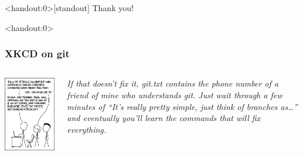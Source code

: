 \documentclass[10pt,svgnames,handout]{beamer}
\begin{document}


\begin{frame}<handout:0>[standout]
Thank you!
\end{frame}


\appendix

\begin{frame}<handout:0>
\label{xkcd_git}
\frametitle{XKCD on git \hfill\hyperlink{git_cons}{}}

\begin{columns}[T,onlytextwidth]
\includegraphics[width=\textwidth]{figures/xkcd-git.png}

\vfill
\emph{If that doesn't fix it, git.txt contains the phone number of a friend of mine who understands git.
Just wait through a few minutes of “It's really pretty simple, just think of branches as\ldots” and eventually you'll learn the commands that will fix everything.
}
\end{columns}
\end{frame}
\end{document}
